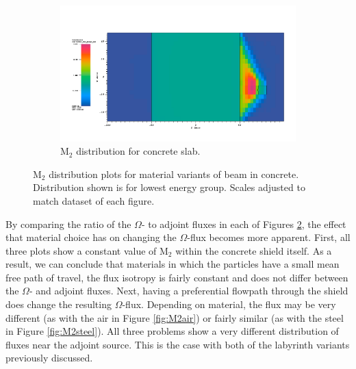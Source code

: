 \begin{figure}[htb!]\ContinuedFloat
  \centering
  \begin{subfigure}[t]{\textwidth}
    \includegraphics[width=0.9\linewidth]{./chapters/characterization_probs/figures/char/prob1v2/prob1v2M2G26.png}
    \caption{M$_2$ distribution for concrete slab.}
    \label{fig:M2concrete}
  \end{subfigure}
  \caption[M$_2$ distribution plots for material variants of beam in
  concrete.]{M$_2$ distribution plots for material variants of beam in
  concrete. Distribution shown is for lowest energy group. Scales adjusted to
  match dataset of each figure.}
  \label{fig:M2beamplots}
\end{figure}

By comparing the ratio of the $\Omega$- to adjoint fluxes in each of Figures \ref{fig:M2beamplots}, the effect that material choice has on changing the
$\Omega$-flux becomes more apparent. First, all three plots show a constant
value of M$_2$ within the concrete shield itself. As a result, we can conclude
that materials in which the particles have a small mean free path of travel, the
flux isotropy is fairly constant and does not differ between the $\Omega$- and
adjoint fluxes. Next, having a preferential flowpath through the shield does
change the resulting $\Omega$-flux. Depending on material, the flux may be very
different (as with the air in Figure \ref{fig:M2air}) or fairly similar (as with
the steel in Figure \ref{fig:M2steel}). All three problems
show a very different distribution of fluxes near the adjoint source. This is
the case with both of the labyrinth variants previously discussed.

